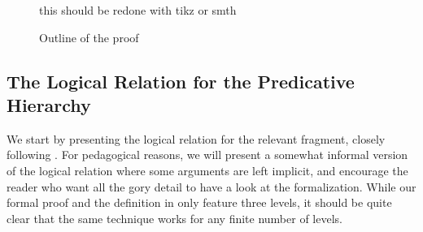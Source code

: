\begin{figure}
	this should be redone with tikz or smth
  \caption{Outline of the proof}
  \label{fig:proof-outline}
\end{figure}



\subsection{The Logical Relation for the Predicative Hierarchy}

We start by presenting the logical relation for the relevant
fragment, closely following .
%
For pedagogical reasons, we will present a somewhat informal version
of the logical relation where some arguments are left implicit, and
encourage the reader who want all the gory detail to have a look at the \Agda 
formalization. 
%
While our formal proof and the definition in
 only feature three levels, it should be
quite clear that the same technique works for any finite number of
levels.

